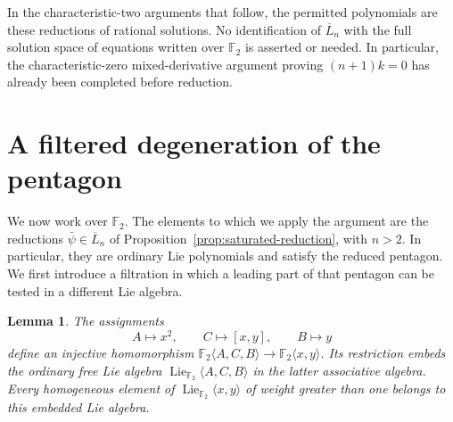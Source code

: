 \documentclass[11pt]{article}
\newtheorem{lemma}[theorem]{Lemma}
\theoremstyle{definition}
\theoremstyle{remark}
\numberwithin{equation}{section}
\begin{document}
In the characteristic-two arguments that follow, the permitted
polynomials are these reductions of rational solutions.  No
identification of \(\overline L_n\) with the full solution space of
equations written over \({\mathbb F_2}\) is asserted or needed.  In particular,
the characteristic-zero mixed-derivative argument proving
\((n+1)k=0\) has already been completed before reduction.

\section{A filtered degeneration of the pentagon}
\label{sec:degeneration}

We now work over ${\mathbb F_2}$.  The elements to which we apply the
argument are the reductions $\bar\psi\in\overline L_n$ of
Proposition~\ref{prop:saturated-reduction}, with $n>2$.  In particular,
they are ordinary Lie polynomials and satisfy the reduced pentagon.
We first introduce a filtration in which a leading part of that pentagon
can be tested in a different Lie algebra.

\begin{samepage}
\begin{lemma}\label{lem:abc-free}
The assignments
\[
 A\longmapsto x^2,\qquad C\longmapsto[x,y],\qquad B\longmapsto y
\]
define an injective homomorphism
${\mathbb F_2}\langle A,C,B\rangle\longrightarrow{\mathbb F_2}\langle x,y\rangle$.
Its restriction embeds the ordinary free Lie algebra
$\operatorname{Lie}_{{\mathbb F_2}}\langle A,C,B\rangle$ in the latter associative algebra.
Every homogeneous element of $\operatorname{Lie}_{{\mathbb F_2}}\langle x,y\rangle$ of weight
greater than one belongs to this embedded Lie algebra.
\end{lemma}
\end{samepage}
\end{document}
